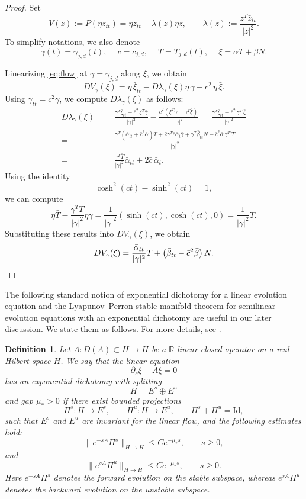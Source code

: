 \documentclass[11pt]{amsart}
\theoremstyle{plain}
\newtheorem{defn}[thm]{Definition}
\theoremstyle{definition}
\newcommand{\R}{\mathbb{R}}
\begin{document}
\begin{proof}
Set
\[
V(z):=P(\eta\bar{z}_{tt})=\eta\bar{z}_{tt}-\lambda(z)\eta\bar{z},\qquad \lambda(z):=\frac{z^T\bar{z}_{tt}}{|z|^2}.\]
To simplify notations, we also denote
\[\gamma(t)=\gamma_{j,d}(t),\quad~ c=c_{j,d},\quad~ T=T_{j,d}(t),\quad~ \xi=\alpha T+\beta N.\]

Linearizing \eqref{eq:flow} at $\gamma=\gamma_{j,d}$ along $\xi$, we obtain
\[DV_{\gamma}(\xi)=\eta\,\bar{\xi}_{tt}-D\lambda_{\gamma}(\xi)\eta\,\bar\gamma-\bar{c}^2\,\eta\,\bar{\xi}.\]
Using $\gamma_{tt}=c^2\gamma$, we compute $D\lambda_{\gamma}(\xi)$ as follows:
\begin{align*}
    D\lambda_{\gamma}(\xi)=~&\frac{\gamma^T\bar{\xi}_{tt}+\bar{c}^2\,\xi^T \bar \gamma}{|\gamma|^2}-\frac{\bar c^2(\xi^T \bar \gamma+ \gamma^T \bar \xi)}{|\gamma|^2}=~\frac{\gamma^T\bar{\xi}_{tt}-\bar{c}^2\,\gamma^T\,\bar{\xi}}{|\gamma|^2}\\
    =~&\frac{\gamma^T(\bar{\alpha}_{tt}+\bar{c}^2\bar{\alpha})\bar{T}+2\gamma^T\bar{c}\bar{\alpha}_t\bar{\gamma}+\gamma^T\bar{\beta}_{tt}N-\bar{c}^2\bar \alpha\,\gamma^T\,\bar{T}}{|\gamma|^2}\\
    =~&\frac{\gamma^T\bar{T}}{|\gamma|^2} \bar{\alpha}_{tt}+2\bar{c}\,\bar{\alpha}_t.
\end{align*}
Using the identity
\[\cosh^2(ct)-\sinh^2(ct)=1,\]
we can compute
\[\eta\bar{T}-\frac{\gamma^T\bar{T}}{|\gamma|^2} \eta \bar \gamma=\frac{1}{|\gamma|^2}(\sinh(ct),\cosh(ct),0)=\frac{1}{|\gamma|^2}T.\]
Substituting these results into $DV_{\gamma}(\xi)$, 
we obtain
\[DV_{\gamma}(\xi)=\frac{\bar{\alpha}_{tt}}{|\gamma|^2}T+\left(\bar{\beta}_{tt}-\bar{c}^2\bar{\beta}\right)N.\qedhere\]
\end{proof}

The following standard notion of exponential dichotomy for a linear evolution equation and the  Lyapunov--Perron stable-manifold theorem for semilinear evolution equations with an exponential dichotomy are useful in our later discussion. We state them as follows. For more details, see \cite{Henry1981, Lin1986, PSS1997, Schnaubelt1999}.


\begin{defn}\label{def:exponential-dichotomy}
Let $A:D(A)\subset H\to H$ be a $\R$-linear closed operator on a real
Hilbert space $H$.  We say that the linear equation
\[
 \partial_s\xi+A\xi=0
\]
has an exponential dichotomy with splitting
\[
 H=E^s\oplus E^u
\]
and gap $\mu_*>0$ if there exist bounded projections
\[
 \Pi^s:H\to E^s,\qquad \Pi^u:H\to E^u,
 \qquad \Pi^s+\Pi^u=\mathrm{Id},
\]
such that $E^s$ and $E^u$ are invariant for the linear flow, and the
following estimates hold:
\[
 \|e^{-sA}\Pi^s\|_{H\to H}\le C e^{-\mu_*s},
 \qquad s\ge0,
\]
and
\[
 \|e^{sA}\Pi^u\|_{H\to H}\le C e^{-\mu_*s},
 \qquad s\ge0.
\]
Here $e^{-sA}\Pi^s$ denotes the forward evolution on the stable subspace,
whereas $e^{sA}\Pi^u$ denotes the backward evolution on the unstable
subspace.
\end{defn}
\end{document}
